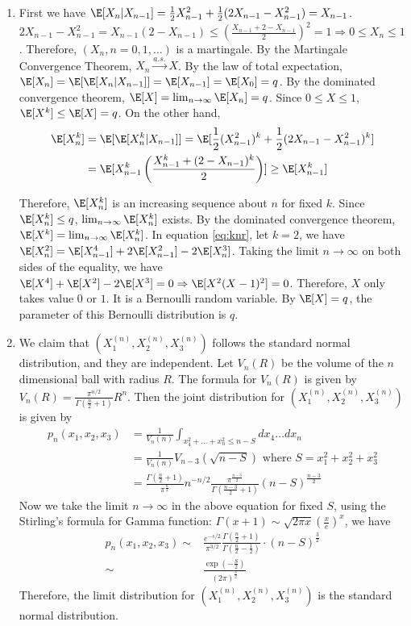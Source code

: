 \documentclass{article}
\begin{document}
\begin{enumerate}
\begin{enumerate}
\end{enumerate}
\item First we have $\E[X_n | X_{n-1}] = \frac{1}{2}
X_{n-1}^2 + \frac{1}{2} (2X_{n-1} - X^2_{n-1})
= X_{n-1}$. $2X_{n-1} - X^2_{n-1}
=X_{n-1}(2-X_{n-1}) \leq (\frac{X_{n-1} + 2 - X_{n-1}}{2})^2=1 \Rightarrow 0 \leq X_n \leq 1$. Therefore, $(X_n,n=0,1,\dots)$ is a martingale. By the Martingale Convergence
Theorem, $X_n \xrightarrow{a.s.} X$.
By the law of total expectation,
$\E[X_n]=\E[\E[X_n|X_{n-1}]] = \E[X_{n-1}]=\E[X_0]=q$.
By the dominated convergence theorem,
$\E[X]=\lim_{n\to \infty} \E[X_n]=q$.
Since $0\leq X \leq 1$, $\E[X^k] \leq \E[X]=q$.
On the other hand,
\begin{align}
    \E[X_{n}^k]
&=\E[\E[X^k_n|X_{n-1}]]
=\E[\frac{1}{2} (X_{n-1}^2)^k
+ \frac{1}{2} (2X_{n-1} - X_{n-1}^2)^k ]
\label{eq:knr}\\
&=\E[X^k_{n-1}\left(
\frac{X_{n-1}^k + (2-X_{n-1})^k}{2}
\right)]
\geq \E[X_{n-1}^k]
\end{align}

Therefore,
$\E[X_{n}^k]$ is an increasing sequence about $n$ for fixed $k$. Since $\E[X_{n}^k] \leq q$,
$\lim_{n\to \infty} \E[X_n^k]$ exists.
By the dominated convergence theorem,
$\E[X^k] = \lim_{n\to\infty} \E[X_{n}^k]$.
In equation \eqref{eq:knr}, let $k=2$,
we have
$\E[X_{n}^2] = \E[X_{n-1}^4]
+2\E[X_{n-1}^2] - 2\E[X_n^3]$.
Taking the limit $n\to \infty$ on both
sides of the equality, we have
$\E[X^4]+\E[X^2]-2\E[X^3]=0 \Rightarrow
\E[X^2(X-1)^2]=0$. Therefore, $X$ only
takes value $0$ or $1$. It is a Bernoulli
random variable. By $\E[X]=q$, the parameter
of this Bernoulli distribution is $q$.
\item We claim that $(X_1^{(n)},
X_2^{(n)}, X_3^{(n)})
$ follows the standard normal distribution, and
they are independent.
Let $V_n(R)$ be the volume of the $n$
dimensional ball with radius $R$.
The formula for $V_n(R)$
is given by $V_n(R)=\frac{\pi^{n/2}}{\Gamma(\frac{n}{2}+1)}R^n$. Then the joint distribution
for $(X_1^{(n)},
X_2^{(n)}, X_3^{(n)})
$ is given by
\begin{align*}
    p_n(x_1, x_2, x_3)
    &= \frac{1}{V_n(n)}
    \int_{x_4^2+\dots + x_n^2 \leq n - S} dx_4\dots dx_n \\
    &= \frac{1}{V_n(n)} V_{n-3}(\sqrt{n-S})
    \textrm{ where } S=x_1^2 + x_2^2 + x_3^2 \\
    & = \frac{\Gamma(\frac{n}{2} + 1)}{\pi^{\frac{n}{2}}} n^{-n/2}
    \frac{\pi^{\frac{n-3}{2}}}{\Gamma(\frac{n-3}{2} + 1)} (n-S)^{\frac{n-3}{2}}
\end{align*}
Now we take the limit $n\to \infty$ in the above
equation for fixed $S$, using the Stirling's
formula for Gamma function:
$\Gamma(x+1) \sim \sqrt{2\pi x}(\frac{x}{e})^x$,
we have
\begin{align*}
    p_n(x_1, x_2, x_3) \sim
    & \frac{e^{-s/2}}{\pi^{3/2}}
    \frac{\Gamma(\frac{n}{2}+1)}{\Gamma(\frac{n}{2}-\frac{1}{2})}\cdot (n-S)^{\frac{3}{2}}
    \\
    \sim &
    \frac{\exp(-\frac{S}{2})}{(2\pi)^{\frac{3}{2}}}
\end{align*}
Therefore, the limit distribution for $(X_1^{(n)},
X_2^{(n)}, X_3^{(n)})
$ is the standard normal distribution.
\end{enumerate}
\end{document}
